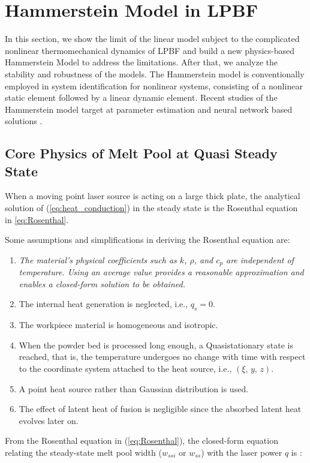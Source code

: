 \documentclass [11pt, proquest] {uwthesis}[2020/02/24]
\begin{document}
\section{\label{sec:HAMMERSTEIN-MODEL-IN}Hammerstein Model in LPBF}

In this section, we show the limit of the linear model subject to
the complicated nonlinear thermomechanical dynamics of LPBF and build
a new physics-based Hammerstein Model to address the limitations.
After that, we analyze the stability and robustness of the models.
The Hammerstein model is conventionally employed in system identification
for nonlinear systems, consisting of a nonlinear static element followed
by a linear dynamic element. Recent studies of the Hammerstein model
target at parameter estimation and neural network based solutions
\cite{rayouf2019new,doyle2002identification,ren2011identification}. 

\subsection{\label{subsec:Analytical-Solutions}Core Physics of Melt Pool at
Quasi Steady State}

When a moving point laser source is acting on a large thick plate,
the analytical solution of (\ref{eq:heat_conduction}) in the steady
state is the Rosenthal equation in \ref{eq:Rosenthal}.

Some assumptions and simplifications in deriving the Rosenthal equation
are:
\begin{enumerate}
\item \emph{The material\textquoteright s physical coefficients such as
$k$, $\rho$, and $c_{p}$ are independent of temperature. Using
an average value provides a reasonable approximation and enables a
closed-form solution to be obtained.}
\item The internal heat generation is neglected, i.e., $q_{s}=0$. 
\item The workpiece material is homogeneous and isotropic.
\item When the powder bed is processed long enough, a Quasistationary state
is reached, that is, the temperature undergoes no change with time
with respect to the coordinate system attached to the heat source,
i.e., $(\xi,\,y,\,z)$.
\item A point heat source rather than Gaussian distribution is used.
\item The effect of latent heat of fusion is negligible since the absorbed
latent heat evolves later on.
\end{enumerate}
From the Rosenthal equation in (\ref{eq:Rosenthal}), the closed-form
equation relating the steady-state melt pool width ($w_{ssi}$ or
$w_{ss}$) with the laser power $q$ is \cite{tang2017prediction}:
\end{document}
